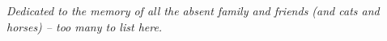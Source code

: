 \thispagestyle{empty}
\vspace*{\fill}
\begin{center}
\itshape
Dedicated to the memory of all the absent family and friends (and cats and horses) – too many to list here.


\end{center}
\vspace*{\fill}
\clearpage

